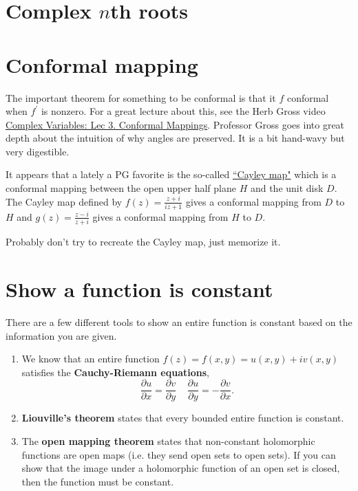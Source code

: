 \documentclass[10pt]{article}
\begin{document}
\section{Complex $n$th roots}

\section{Conformal mapping}

The important theorem for something to be conformal is that it $f$ conformal when $f^\prime$ is nonzero. For a great lecture about this, see the Herb Gross video \href{https://www.youtube.com/watch?v=s1DFa1dCss0}{Complex Variables: Lec 3. Conformal Mappings}. Professor Gross goes into great depth about the intuition of why angles are preserved. It is a bit hand-wavy but very digestible. 

It appears that a lately a PG favorite is the so-called \href{http://www-users.math.umn.edu/~garrett/m/complex/notes_2014-15/07_conformal_mapping.pdf}{``Cayley map"} which is a conformal mapping between the open upper half plane $H$ and the unit disk $D$.
The Cayley map defined by $f(z) = \frac{z+i}{iz+1}$ gives a conformal mapping from $D$ to $H$ and $g(z) = \frac{z-i}{z+i}$ gives a conformal mapping from $H$ to $D$.

Probably don't try to recreate the Cayley map, just memorize it.


\section{Show a function is constant}

There are a few different tools to show an entire function is constant based on the information you are given.

\begin{enumerate}
\item We know that an entire function $f(z) = f(x,y) = u(x,y) + i v(x,y)$ satisfies the \textbf{Cauchy-Riemann equations},
\[ \frac{\partial u}{\partial x} = \frac{\partial v}{\partial y} \; \; \; \; \frac{\partial u}{\partial y} = - \frac{\partial v}{\partial x} .\]
\item \textbf{Liouville's theorem} states that every bounded entire function is constant.
\item The \textbf{open mapping theorem} states that non-constant holomorphic functions are open maps (i.e. they send open sets to open sets). If you can show that the image under a holomorphic function of an open set is closed, then the function must be constant.
\end{enumerate}
\end{document}
